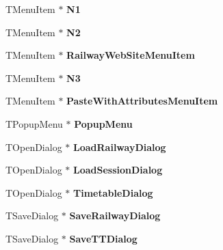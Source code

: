 \begin{DoxyCompactItemize}
\item 
\mbox{\label{class_t_interface_a424b363a104a95f4822dd16de1097ede}} 
T\+Menu\+Item $\ast$ {\bfseries N1}
\item 
\mbox{\label{class_t_interface_aa8e2cca943dae09344c978022b88dd2b}} 
T\+Menu\+Item $\ast$ {\bfseries N2}
\item 
\mbox{\label{class_t_interface_aa576dc5d61c896895f249cdf8d7ccfc5}} 
T\+Menu\+Item $\ast$ {\bfseries Railway\+Web\+Site\+Menu\+Item}
\item 
\mbox{\label{class_t_interface_a1b5a32294b339476a9af8f269ed9194f}} 
T\+Menu\+Item $\ast$ {\bfseries N3}
\item 
\mbox{\label{class_t_interface_a039a43bfeefcbc4dcdf273c24f1140a1}} 
T\+Menu\+Item $\ast$ {\bfseries Paste\+With\+Attributes\+Menu\+Item}
\item 
\mbox{\label{class_t_interface_ac0962233c50c6c67c55b71b54b634b9b}} 
T\+Popup\+Menu $\ast$ {\bfseries Popup\+Menu}
\item 
\mbox{\label{class_t_interface_ae2ab1b35577d8792f335abf9e79a4993}} 
T\+Open\+Dialog $\ast$ {\bfseries Load\+Railway\+Dialog}
\item 
\mbox{\label{class_t_interface_ae32059dc470055869c4a80f3a6bb2d89}} 
T\+Open\+Dialog $\ast$ {\bfseries Load\+Session\+Dialog}
\item 
\mbox{\label{class_t_interface_a758b51dda35130516245695b75927540}} 
T\+Open\+Dialog $\ast$ {\bfseries Timetable\+Dialog}
\item 
\mbox{\label{class_t_interface_a87004256f6d88054b975e72245b2f422}} 
T\+Save\+Dialog $\ast$ {\bfseries Save\+Railway\+Dialog}
\item 
\mbox{\label{class_t_interface_a3128e74692773ba42cbd127dfdbb190e}} 
T\+Save\+Dialog $\ast$ {\bfseries Save\+T\+T\+Dialog}
\item 
\mbox{\label{class_t_interface_a60a9276c65b1612112ea2dd020ea353c}} 

\end{DoxyCompactItemize}
